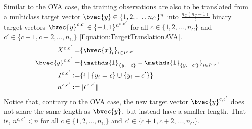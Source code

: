 				Similar to the OVA case, the training observations are also to be translated from a multiclass target vector $\bvec{y} \in \{1, 2, \dots, n_{C}\}^{n}$ into $\frac{n_{C} (n_{C} - 1)}{2}$ binary target vectors $\bvec{y}^{c, c'} \in \{-1, 1\}^{n^{c, c'}}$ for all $c \in \{1, 2, \dots, n_{C}\}$ and $c' \in \{c + 1, c + 2, \dots, n_{C}\}$ \eqref{Equation:TargetTranslationAVA}. \begin{equation}
					\begin{aligned}
						X^{c, c'} =& \{\bvec{x}_{i}\}_{i \in I^{c, c'}} \\
						\bvec{y}^{c, c'} =& \{\mathds{1}_{\{y_{i} = c\}} - \mathds{1}_{\{y_{i} = c'\}}\}_{i \in I^{c, c'}} \\
						I^{c, c'} :=& \{i \; | \; \{y_{i} = c\} \cup \{y_{i} = c'\} \} \\
						n^{c, c'} :=& \Vert I^{c, c'} \Vert
					\end{aligned}
				\label{Equation:TargetTranslationAVA}
				\end{equation} Notice that, contrary to the OVA case, the new target vector $\bvec{y}^{c, c'}$ does not share the same length as $\bvec{y}$, but instead have a smaller length. That is, $n^{c, c'} < n$ for all $c \in \{1, 2, \dots, n_{C}\}$ and $c' \in \{c + 1, c + 2, \dots, n_{C}\}$.
				
